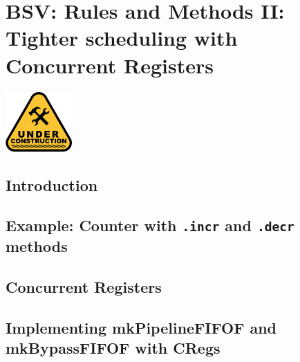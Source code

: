 

\chapter{BSV: Rules and Methods II: Tighter scheduling with Concurrent Registers}


\setcounter{page}{1}
\renewcommand{\thepage}{\arabic{chapter}-\arabic{page}}

\label{ch_Rules_II}


\vspace{2ex}

\centerline{\includegraphics[width=1in,angle=0]{Figures/Fig_Under_Construction}}

\vspace{2ex}

\section{Introduction}

\section{Example: Counter with {\tt .incr} and {\tt .decr} methods}

\section{Concurrent Registers}

\section{Implementing mkPipelineFIFOF and mkBypassFIFOF with CRegs}

